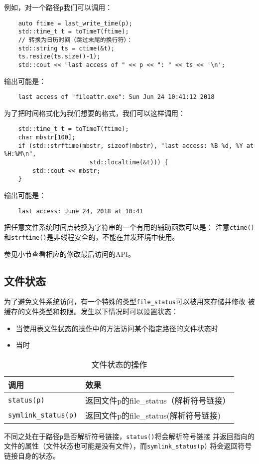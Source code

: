 例如，对一个路径\texttt{p}我们可以调用：
\begin{lstlisting}
    auto ftime = last_write_time(p);
    std::time_t t = toTimeT(ftime);
    // 转换为日历时间（跳过末尾的换行符）：
    std::string ts = ctime(&t);
    ts.resize(ts.size()-1);
    std::cout << "last access of " << p << ": " << ts << '\n';
\end{lstlisting}
输出可能是：
\begin{lstlisting}
    last access of "fileattr.exe": Sun Jun 24 10:41:12 2018
\end{lstlisting}
为了把时间格式化为我们想要的格式，我们可以这样调用：
\begin{lstlisting}
    std::time_t t = toTimeT(ftime);
    char mbstr[100];
    if (std::strftime(mbstr, sizeof(mbstr), "last access: %B %d, %Y at %H:%M\n",
                        std::localtime(&t))) {
        std::cout << mbstr;
    }
\end{lstlisting}
输出可能是：
\begin{lstlisting}
    last access: June 24, 2018 at 10:41
\end{lstlisting}
把任意文件系统时间点转换为字符串的一个有用的辅助函数可以是：
注意\texttt{ctime()}和\texttt{strftime()}是非线程安全的，不能在并发环境中使用。

参见小节查看相应的修改最后访问的API。

\subsection{文件状态}\label{ch20.4.2}
为了避免文件系统访问，有一个特殊的类型\texttt{file\_status}可以被用来存储并修改
被缓存的文件类型和权限。发生以下情况时可以设置状态：
\begin{itemize}
    \item 当使用表\hyperref[t20.12]{文件状态的操作}中的方法访问某个指定路径的文件状态时
    \item 当时
\end{itemize}
\begin{table}[ht]
    \centering
    \begin{tabular}{l|l}
        \hline
        \textbf{调用}                 & \textbf{效果}                \\
        \hline
        \texttt{status(p)}          & 返回文件p的file\_status（解析符号链接） \\
        \texttt{symlink\_status(p)} & 返回文件p的file\_status(解析符号链接) \\
        \hline
    \end{tabular}
    \caption{文件状态的操作}
    \label{t20.12}
\end{table}
不同之处在于路径\texttt{p}是否解析符号链接，\texttt{status()}将会解析符号链接
并返回指向的文件的属性（文件状态也可能是没有文件），而\texttt{symlink\_status(p)}
将会返回符号链接自身的状态。

